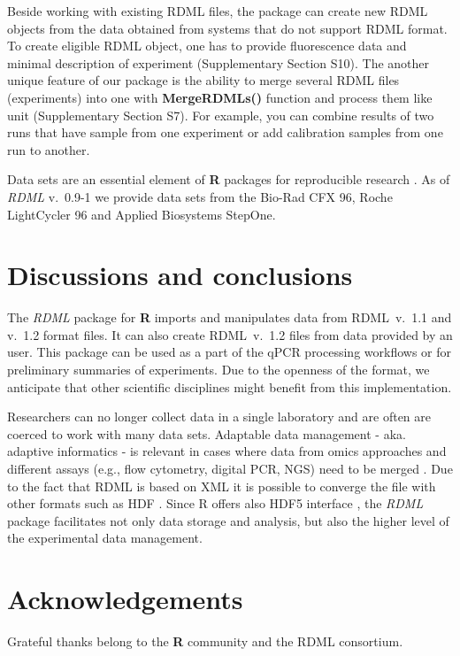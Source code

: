 \documentclass{bioinfo}
\begin{document}
	Beside working with existing RDML files, the package can create new RDML 
objects from the data obtained from systems that do not support RDML format. To 
create eligible RDML object, one has to provide fluorescence data and minimal 
description of experiment (Supplementary Section S10). The another unique feature of our 
package is the ability to merge several RDML files (experiments) into one with 
\textbf{MergeRDMLs()} function and process them like unit (Supplementary Section 
S7). For example, you can combine results of two runs that have sample from one 
experiment or add calibration samples from one run to another.

Data sets are an essential element of \textbf{R} packages for reproducible 
research \cite{roediger2015r}. As of \textit{RDML} v.~0.9-1 we provide data sets 
from the Bio-Rad CFX 96, Roche LightCycler 96 and Applied Biosystems StepOne.

\section{Discussions and conclusions}
	
	The \textit{RDML} package for \textbf{R} imports and manipulates data 
from RDML~v.~1.1 and v.~1.2 format files. It can also create RDML~v.~1.2 files 
from data provided by an user. This package can be used as a part of the qPCR 
processing workflows or for preliminary summaries of experiments. Due to the 
openness of the format, we anticipate that other scientific disciplines might 
benefit from this implementation.

Researchers can no longer collect data in a single laboratory and are often are 
coerced to work with many data sets. Adaptable data management - aka. adaptive 
informatics - is relevant in cases where data from omics approaches and 
different assays (e.g., flow cytometry, digital PCR, NGS) need to be merged 
\cite{baker_quantitative_2012}. Due to the fact that RDML is based on XML it is 
possible to converge the file with other formats such as HDF 
\cite{millard_adaptive_2011}. Since R offers also HDF5 interface 
\cite{Fischer_HDF5}, the \textit{RDML} package facilitates not only data storage 
and analysis, but also the higher level of the experimental data management.

\section{Acknowledgements}
Grateful thanks belong to the \textbf{R} community and the RDML consortium.
	
\end{document}
